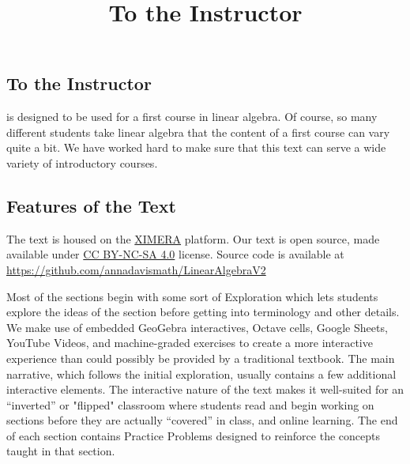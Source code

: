 \documentclass{ximera}
\title{To the Instructor} \license{CC BY-NC-SA 4.0}
\begin{document}
\begin{abstract}
\end{abstract}
\maketitle

\begin{onlineOnly}
\section*{To the Instructor}
\end{onlineOnly}

 is designed to be used for a first course in linear algebra.  Of course, so many different students take linear algebra that the content of a first course can vary quite a bit.  We have worked hard to make sure that this text can serve a wide variety of introductory courses. 

\subsection*{Features of the Text}

The text is housed on the \href{https://ximera.osu.edu/}{XIMERA} platform. %
Our text is open source, made available under \href{https://creativecommons.org/licenses/by-sa/4.0/deed.en}{CC BY-NC-SA 4.0} license.  Source code is available at \href{https://github.com/annadavismath/LinearAlgebraV2}{https://github.com/annadavismath/LinearAlgebraV2}

Most of the sections begin with some sort of Exploration which lets students explore the ideas of the section before getting into terminology and other details.  We make use of embedded GeoGebra interactives, Octave cells, Google Sheets, YouTube Videos, and machine-graded exercises to create a more interactive experience than could possibly be provided by a traditional textbook.  The main narrative, which follows the initial exploration, usually contains a few additional interactive elements.  The interactive nature of the text %
makes it well-suited for an ``inverted'' or "flipped" classroom where students read and begin working on sections before they are actually ``covered'' in class, and online learning.  The end of each section contains Practice Problems designed to reinforce the concepts taught in that section.
\end{document}

